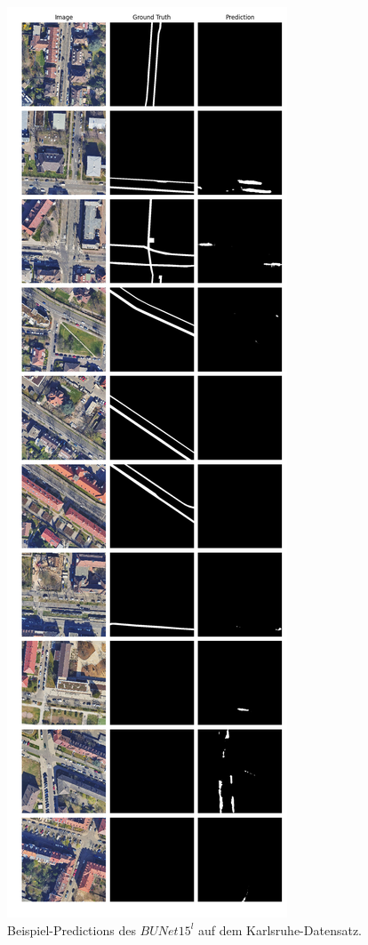 \begin{figure}
	\centering
	\includegraphics[width=.41\textwidth]{Bilder/Samples-KA/bunet15-l.png} 
	\caption{Beispiel-Predictions des $BUNet15^l$ auf dem Karlsruhe-Datensatz.}
	\label{fig:ka-samples-bunet15-l}
\end{figure}

